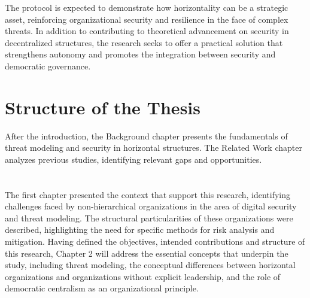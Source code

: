 The protocol is expected to demonstrate how horizontality can be a strategic
asset, reinforcing organizational security and resilience in the face of complex
threats. In addition to contributing to theoretical advancement on security in
decentralized structures, the research seeks to offer a practical solution that
strengthens autonomy and promotes the integration between security and
democratic governance.

\section{Structure of the Thesis}
\label{sec:structure_thesis}

After the introduction, the Background chapter presents the fundamentals of
threat modeling and security in horizontal structures. The Related Work chapter
analyzes previous studies, identifying relevant gaps and opportunities.

\section*{} 
The first chapter presented the context that support this research, identifying
challenges faced by non-hierarchical organizations in the area of digital
security and threat modeling. The structural particularities of these
organizations were described, highlighting the need for specific methods for
risk analysis and mitigation. Having defined the objectives, intended
contributions and structure of this research, Chapter 2 will address the
essential concepts that underpin the study, including threat modeling, the
conceptual differences between horizontal organizations and organizations
without explicit leadership, and the role of democratic centralism as an
organizational principle.

